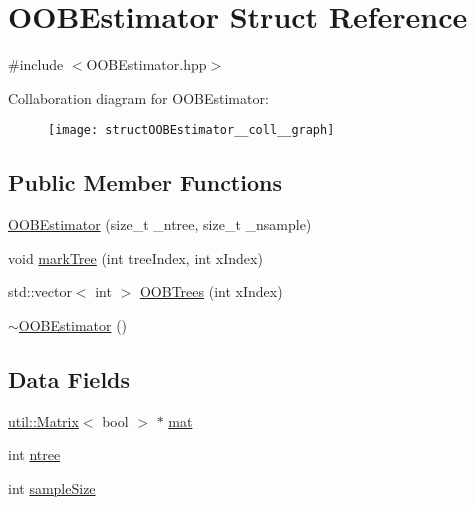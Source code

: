 \hypertarget{structOOBEstimator}{}\section{O\+O\+B\+Estimator Struct Reference}
\label{structOOBEstimator}


{\ttfamily \#include $<$O\+O\+B\+Estimator.\+hpp$>$}



Collaboration diagram for O\+O\+B\+Estimator\+:\nopagebreak
\begin{figure}[H]
\begin{center}
\leavevmode
\texttt{[image: structOOBEstimator\_\_coll\_\_graph]}
\end{center}
\end{figure}
\subsection*{Public Member Functions}
\begin{DoxyCompactItemize}
\item 
\hyperlink{structOOBEstimator_a14346003c044f4f83d901191db629838}{O\+O\+B\+Estimator} (size\+\_\+t \+\_\+ntree, size\+\_\+t \+\_\+nsample)
\item 
void \hyperlink{structOOBEstimator_a3f6c58438a669a75c2013e284c16c038}{mark\+Tree} (int tree\+Index, int x\+Index)
\item 
std\+::vector$<$ int $>$ \hyperlink{structOOBEstimator_a562eaa254b4d88129369ca3a33cd03f2}{O\+O\+B\+Trees} (int x\+Index)
\item 
\hyperlink{structOOBEstimator_a52be024d6b911e15a162f92c44760b7d}{$\sim$\+O\+O\+B\+Estimator} ()
\end{DoxyCompactItemize}
\subsection*{Data Fields}
\begin{DoxyCompactItemize}
\item 
\hyperlink{classutil_1_1Matrix}{util\+::\+Matrix}$<$ bool $>$ $\ast$ \hyperlink{structOOBEstimator_adff3279f68eba078d403e2673aa6627e}{mat}
\item 
int \hyperlink{structOOBEstimator_af09c508b17686ca379d67affa1f31333}{ntree}
\item 
int \hyperlink{structOOBEstimator_a199a3bf3234bd967e061b1c61a56aed6}{sample\+Size}
\end{DoxyCompactItemize}


